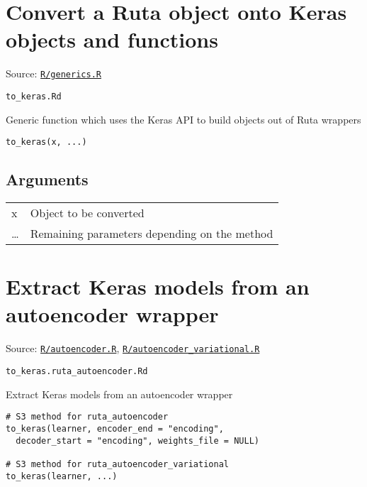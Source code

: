 \section{Convert a Ruta object onto Keras objects and
functions}\label{convert-a-ruta-object-onto-keras-objects-and-functions}

Source:
\href{https://github.com/fdavidcl/ruta/blob/master/R/generics.R}{\texttt{R/generics.R}}

\texttt{to\_keras.Rd}

Generic function which uses the Keras API to build objects out of Ruta
wrappers

\begin{verbatim}
to_keras(x, ...)
\end{verbatim}

\hypertarget{arguments}{\subsection{\texorpdfstring{\protect\hyperlink{arguments}{}Arguments}{Arguments}}\label{arguments}}

\begin{longtable}[c]{@{}>{\small}p{3cm}>{\raggedright}p{12.5cm}@{}}
\toprule
x & Object to be converted\tabularnewline
\ldots{} & Remaining parameters depending on the method\tabularnewline
\bottomrule
\end{longtable}

\section{Extract Keras models from an autoencoder
wrapper}\label{extract-keras-models-from-an-autoencoder-wrapper}

Source:
\href{https://github.com/fdavidcl/ruta/blob/master/R/autoencoder.R}{\texttt{R/autoencoder.R}},
\href{https://github.com/fdavidcl/ruta/blob/master/R/autoencoder_variational.R}{\texttt{R/autoencoder\_variational.R}}

\texttt{to\_keras.ruta\_autoencoder.Rd}

Extract Keras models from an autoencoder wrapper

\begin{verbatim}
# S3 method for ruta_autoencoder
to_keras(learner, encoder_end = "encoding",
  decoder_start = "encoding", weights_file = NULL)

# S3 method for ruta_autoencoder_variational
to_keras(learner, ...)
\end{verbatim}

